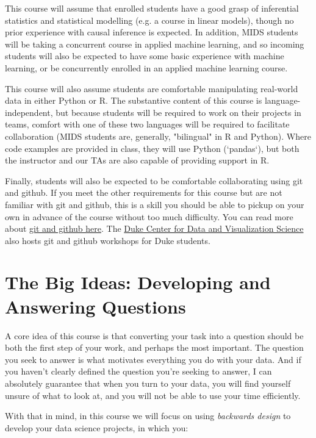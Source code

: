 \documentclass[12pt]{article}
\begin{document}
This course will assume that enrolled students have a good grasp of inferential statistics and statistical modelling (e.g. a course in linear models), though no prior experience with causal inference is expected. In addition, MIDS students will be taking a concurrent course in applied machine learning, and so incoming students will also be expected to have some basic experience with machine learning, or be concurrently enrolled in an applied machine learning course.

This course will also assume students are comfortable manipulating real-world data in either Python or R. The substantive content of this course is language-independent, but because students will be required to work on their projects in teams, comfort with one of these two languages will be required to facilitate collaboration (MIDS students are, generally, "bilingual" in R and Python). Where code examples are provided in class, they will use Python (`pandas`), but both the instructor and our TAs are also capable of providing support in R.

Finally, students will also be expected to be comfortable collaborating using git and github. If you meet the other requirements for this course but are not familiar with git and github, this is a skill you should be able to pickup on your own in advance of the course without too much difficulty. You can read more about \href{https://www.practicaldatascience.org/html/git_and_github.html}{git and github here}. The \href{https://library.duke.edu/data/}{Duke Center for Data and Visualization Science} also hosts git and github workshops for Duke students.

\section{The Big Ideas: Developing and Answering Questions}

A core idea of this course is that converting your task into a question should be both the first step of your work, and perhaps the most important. The question you seek to answer is what motivates everything you do with your data. And if you haven't clearly defined the question you're seeking to answer, I can absolutely guarantee that when you turn to your data, you will find yourself unsure of what to look at, and you will not be able to use your time efficiently.

With that in mind, in this course we will focus on using \emph{backwards design} to develop your data science projects, in which you:
\end{document}
